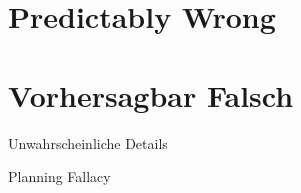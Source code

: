\ifEnglish

\section{Predictably Wrong}





\else


\section{Vorhersagbar Falsch}


\begin{frame}[c]{Unwahrscheinliche Details}
    
\end{frame}



\begin{frame}[c]{Planning Fallacy}
    
\end{frame}



\fi
